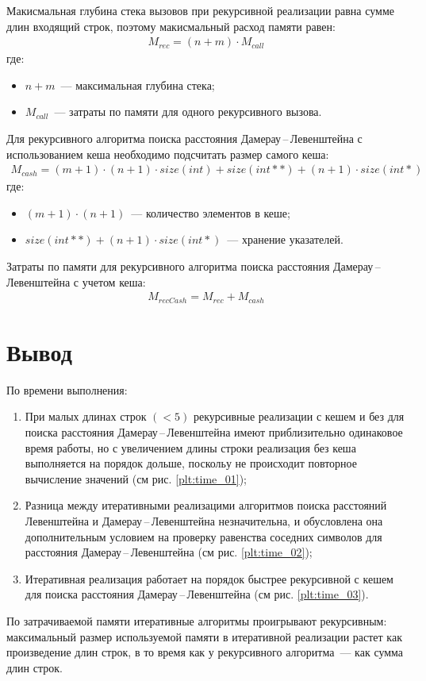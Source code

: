 Макисмальная глубина стека вызовов при рекурсивной реализации равна сумме длин входящий строк, поэтому макисмальный расход памяти равен:
\begin{equation}
	\label{}
	\begin{aligned}
		M_{rec} = (n + m) \cdot M_{call}
	\end{aligned}
\end{equation}
где: 
\begin{itemize}
    \item $n + m$~--- максимальная глубина стека;
	\item $M_{call}$~--- затраты по памяти для одного рекурсивного вызова.
\end{itemize}

Для рекурсивного алгоритма поиска расстояния Дамерау\,--\,Левенштейна с использованием кеша необходимо подсчитать размер самого кеша:
\begin{equation}
	\label{}
	\begin{aligned}
		M_{cash} = (m + 1) \cdot (n + 1) \cdot size(int) + size(int **) + (n + 1) \cdot size(int *)
	\end{aligned}
\end{equation}
где: 
\begin{itemize}
    \item $(m + 1) \cdot (n + 1)$~--- количество элементов в кеше;
	\item $size(int **) + (n + 1) \cdot size(int *)$~--- хранение указателей.
\end{itemize}

Затраты по памяти для рекурсивного алгоритма поиска расстояния Дамерау\,--\,Левенштейна с учетом кеша: 
\begin{equation}
	\label{}
	\begin{aligned}
		M_{recCash} = M_{rec} + M_{cash}
	\end{aligned}
\end{equation}

\section{Вывод}

По времени выполнения:
\begin{enumerate}
	\item При малых длинах строк $(< 5)$ рекурсивные реализации с кешем и без для поиска расстояния Дамерау\,--\,Левенштейна имеют приблизительно одинаковое время работы, 
	но с увеличением длины строки реализация без кеша выполняется на порядок дольше, поскольу не происходит повторное вычисление значений (см рис. \ref{plt:time_01});
	\item Разница между итеративными реализацими алгоритмов поиска расстояний Левенштейна и Дамерау\,--\,Левенштейна незначительна, и обусловлена она
	дополнительным условием на проверку равенства соседних символов для расстояния Дамерау\,--\,Левенштейна (см рис. \ref{plt:time_02});
	\item Итеративная реализация работает на порядок быстрее рекурсивной с кешем для поиска расстояния Дамерау\,--\,Левенштейна (см рис. \ref{plt:time_03}).
\end{enumerate}

По затрачиваемой памяти итеративные алгоритмы проигрывают рекурсивным: максимальный размер используемой памяти в итеративной реализации растет
как произведение длин строк, в то время как у рекурсивного алгоритма~--- как сумма длин строк.